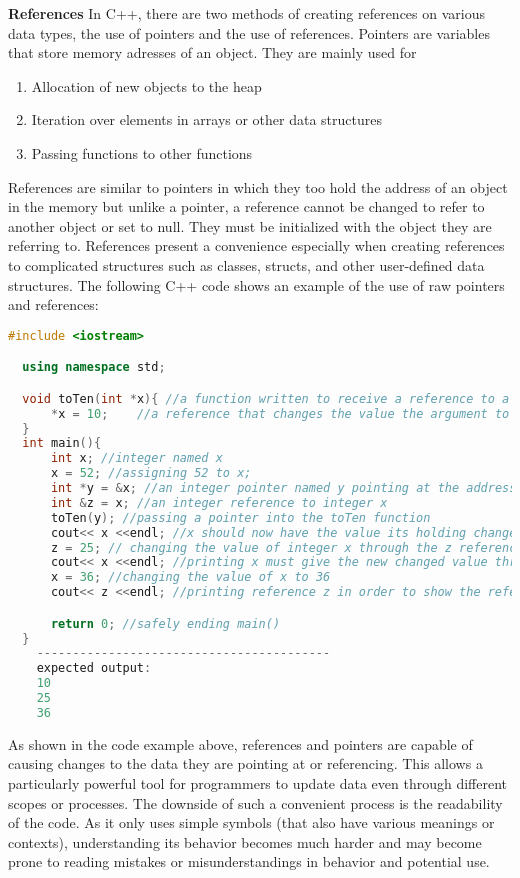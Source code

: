 \documentclass[12pt]{article}
\begin{document}
\textbf{References} In C++, there are two methods of creating references on various data types, the use of pointers and the use of references. Pointers are variables that store memory adresses of an object. They are mainly used for
\begin{enumerate}
  \item Allocation of new objects to the heap
  \item Iteration over elements in arrays or other data structures
  \item Passing functions to other functions
\end{enumerate}
References are similar to pointers in which they too hold the address of an object in the memory but unlike a pointer, a reference cannot be changed to refer to another object or set to null. They must be initialized with the object they are referring to. References present a convenience especially when creating references to complicated structures such as classes, structs, and other user-defined data structures. The following C++ code shows an example of the use of raw pointers and references:

\begin{lstlisting}[language=C++]
  #include <iostream>

  using namespace std;

  void toTen(int *x){ //a function written to receive a reference to a variable
      *x = 10;    //a reference that changes the value the argument to 10
  }
  int main(){
      int x; //integer named x
      x = 52; //assigning 52 to x;
      int *y = &x; //an integer pointer named y pointing at the address of integer x
      int &z = x; //an integer reference to integer x
      toTen(y); //passing a pointer into the toTen function
      cout<< x <<endl; //x should now have the value its holding changed to 10
      z = 25; // changing the value of integer x through the z reference
      cout<< x <<endl; //printing x must give the new changed value through the reference
      x = 36; //changing the value of x to 36
      cout<< z <<endl; //printing reference z in order to show the referencing

      return 0; //safely ending main()
  }
    -----------------------------------------
    expected output:
    10
    25
    36
\end{lstlisting}

As shown in the code example above, references and pointers are capable of causing changes to the data they are pointing at or referencing. This allows a particularly powerful tool for programmers to update data even through different scopes or processes. The downside of such a convenient process is the readability of the code. As it only uses simple symbols (that also have various meanings or contexts), understanding its behavior becomes much harder and may become prone to reading mistakes or misunderstandings in behavior and potential use. 
\end{document}
